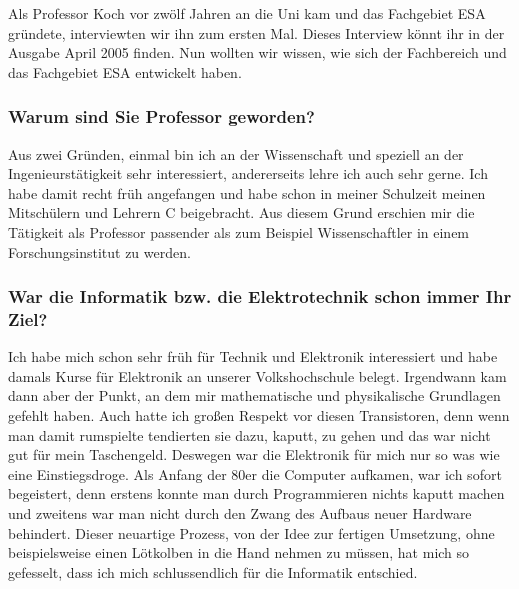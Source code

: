 

{Als Professor Koch vor zwölf Jahren an die Uni kam und das Fachgebiet ESA gründete, interviewten wir ihn zum ersten Mal. Dieses Interview könnt ihr in der Ausgabe April 2005 finden. Nun wollten wir wissen, wie sich der Fachbereich und das Fachgebiet ESA entwickelt haben.
}
{
\subsubsection*{Warum sind Sie Professor geworden?}
Aus zwei Gründen, einmal bin ich an der Wissenschaft und speziell an der Ingenieurstätigkeit sehr interessiert, andererseits lehre ich auch sehr gerne. Ich habe damit recht früh angefangen und habe schon in meiner Schulzeit meinen Mitschülern und Lehrern C beigebracht. Aus diesem Grund erschien mir die Tätigkeit als Professor passender als zum Beispiel Wissenschaftler in einem Forschungsinstitut zu werden. 

\subsubsection{War die Informatik bzw. die Elektrotechnik schon immer Ihr Ziel?}
Ich habe mich schon sehr früh für Technik und Elektronik interessiert und habe damals Kurse für Elektronik an unserer Volkshochschule belegt. Irgendwann kam dann aber der Punkt, an dem mir mathematische und physikalische Grundlagen gefehlt haben. Auch hatte ich großen Respekt vor diesen Transistoren, denn wenn man damit rumspielte tendierten sie dazu, kaputt, zu gehen und das war nicht gut für mein Taschengeld. Deswegen war die Elektronik für mich nur so was wie eine Einstiegsdroge. Als Anfang der 80er die Computer aufkamen, war ich sofort begeistert, denn erstens konnte man durch Programmieren nichts kaputt machen und zweitens war man nicht durch den Zwang des Aufbaus neuer Hardware behindert. Dieser neuartige Prozess, von der Idee zur fertigen Umsetzung, ohne beispielsweise einen Lötkolben in die Hand nehmen zu müssen, hat mich so gefesselt, dass ich mich schlussendlich für die Informatik entschied.

}
